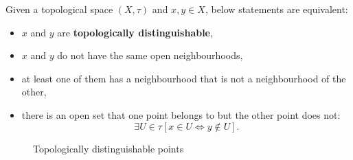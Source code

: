 \documentclass[12pt, letterpaper]{article}
\theoremstyle{definition}
\theoremstyle{remark}
\theoremstyle{definition}
\theoremstyle{plain}
\numberwithin{equation}{section}
\begin{document}
	\begin{def*}
		Given a topological space $(X,\tau)$ and $x,y\in X$,
		below statements are equivalent:
		\begin{itemize}
			\item $x$ and $y$ are \textbf{topologically distinguishable},
			\item $x$ and $y$ do not have the same open neighbourhoods, 
			\item at least one of them has a neighbourhood that is not a neighbourhood of the other,
			\item there is an open set that one point belongs to but the other point does not:
			\[\exists U\in\tau[x\in U\iff y\notin U] .\]
		\end{itemize}
		\begin{figure}[H]
			\centering
			\caption{Topologically distinguishable points}
			\label{fig:topologically_distinguishable}
		\end{figure}
	\end{def*}
\end{document}
